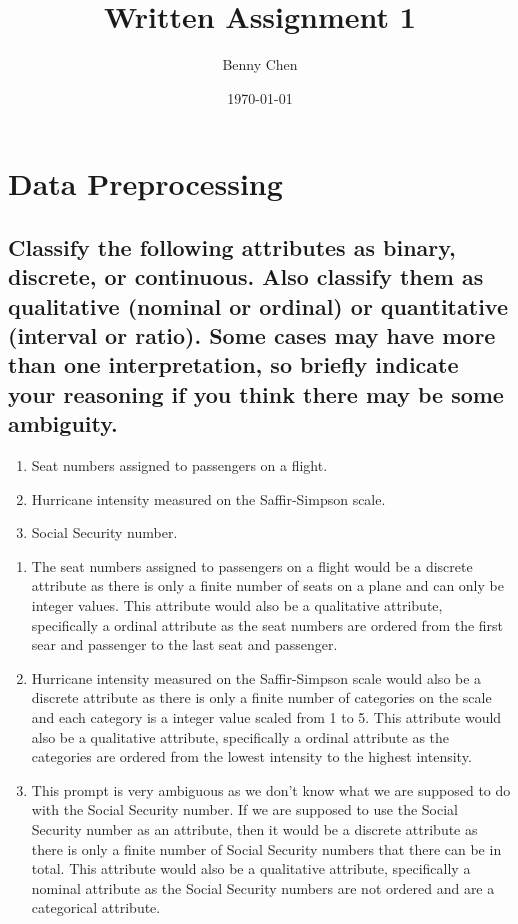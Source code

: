 \documentclass{article}
\title{Written Assignment 1}
\author{Benny Chen}
\date{\today}
\begin{document}
\maketitle

\section{Data Preprocessing}



\subsection*{Classify the following attributes as binary, discrete, or continuous. Also classify them as qualitative (nominal or ordinal) or quantitative (interval or ratio). Some cases may have more than one interpretation, so briefly indicate your reasoning if you think there may be some ambiguity.}

\begin{enumerate}
    \item Seat numbers assigned to passengers on a flight.
    \item Hurricane intensity measured on the Saffir-Simpson scale.
    \item Social Security number.
\end{enumerate}

\begin{enumerate}
    \item The seat numbers assigned to passengers on a flight would be a discrete attribute as there is only a finite number of seats on a plane and can only be integer values. This attribute would also be a qualitative attribute, specifically a ordinal attribute as the seat numbers are ordered from the first sear and passenger to the last seat and passenger.
    \item Hurricane intensity measured on the Saffir-Simpson scale would also be a discrete attribute as there is only a finite number of categories on the scale and each category is a integer value scaled from 1 to 5. This attribute would also be a qualitative attribute, specifically a ordinal attribute as the categories are ordered from the lowest intensity to the highest intensity.
    \item This prompt is very ambiguous as we don't know what we are supposed to do with the Social Security number. If we are supposed to use the Social Security number as an attribute, then it would be a discrete attribute as there is only a finite number of Social Security numbers that there can be in total. This attribute would also be a qualitative attribute, specifically a nominal attribute as the Social Security numbers are not ordered and are a categorical attribute.
\end{enumerate}
\end{document}
